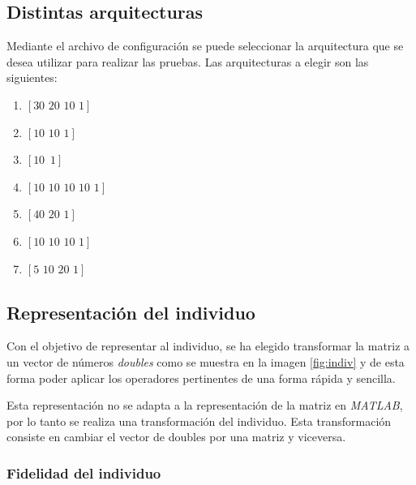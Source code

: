 \documentclass{sig-alternate}
\begin{document}
	\subsection{Distintas arquitecturas}

	Mediante el archivo de configuración se puede seleccionar la arquitectura que se desea utilizar para realizar las pruebas. Las arquitecturas a elegir son las siguientes:

	\begin{center}
		\begin{enumerate}
			\item $[30\,\,20\,\,10\,\,1]$
			\item $[10\,\,10\,\,1]$
			\item $[10\,\,\,1]$
			\item $[10\,\,10\,\,10\,\,10\,\,1]$
			\item $[40\,\,20\,\,1]$
			\item $[10\,\,10\,\,10\,\,1]$
			\item $[5\,\,10\,\,20\,\,1]$
		\end{enumerate}
	\end{center}

	\subsection{Representación del individuo}
Con el objetivo de representar al individuo, se ha elegido transformar la matriz a un vector de números  \textit{doubles} como se muestra en la imagen \ref{fig:indiv} y de esta forma poder aplicar los operadores  pertinentes de una forma rápida y sencilla.

	Esta representación no se adapta a la representación de la matriz en \textit{MATLAB}, por lo tanto se realiza una transformación del individuo. Esta transformación consiste en cambiar el vector de doubles por una matriz y viceversa.

	\subsubsection{Fidelidad del individuo}
\end{document}
